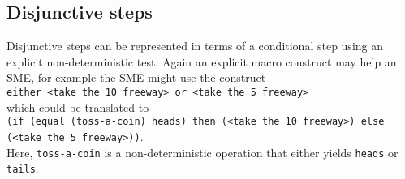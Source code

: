 \documentclass[fullpage]{article}
\begin{document}
\subsection*{Disjunctive steps}

Disjunctive steps can be represented in terms of a conditional step
using an explicit non-deterministic test. Again an explicit macro
construct may help an SME, for example the SME might use the construct \\
{\tt either <take the 10 freeway> or <take the 5 freeway>}\\
which could be translated to\\
{\tt (if (equal (toss-a-coin) heads) then (<take the 10 freeway>)
else (<take the 5 freeway>))}.\\
Here, {\tt toss-a-coin} is a non-deterministic operation that either
yields {\tt heads} or {\tt tails}.
\end{document}
